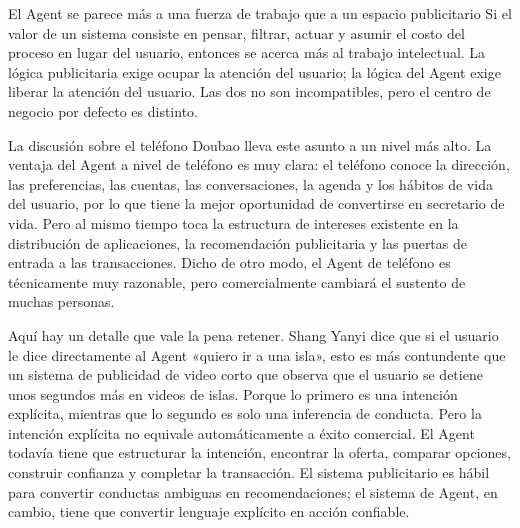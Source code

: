 \documentclass[a4paper]{article}
\begin{document}
\begin{importantbox}{El Agent se parece más a una fuerza de trabajo que a un espacio publicitario}
Si el valor de un sistema consiste en pensar, filtrar, actuar y asumir el costo del proceso en lugar del usuario, entonces se acerca más al trabajo intelectual. La lógica publicitaria exige ocupar la atención del usuario; la lógica del Agent exige liberar la atención del usuario. Las dos no son incompatibles, pero el centro de negocio por defecto es distinto.
\end{importantbox}

La discusión sobre el teléfono Doubao lleva este asunto a un nivel más alto. La ventaja del Agent a nivel de teléfono es muy clara: el teléfono conoce la dirección, las preferencias, las cuentas, las conversaciones, la agenda y los hábitos de vida del usuario, por lo que tiene la mejor oportunidad de convertirse en secretario de vida. Pero al mismo tiempo toca la estructura de intereses existente en la distribución de aplicaciones, la recomendación publicitaria y las puertas de entrada a las transacciones. Dicho de otro modo, el Agent de teléfono es técnicamente muy razonable, pero comercialmente cambiará el sustento de muchas personas.

Aquí hay un detalle que vale la pena retener. Shang Yanyi dice que si el usuario le dice directamente al Agent «quiero ir a una isla», esto es más contundente que un sistema de publicidad de video corto que observa que el usuario se detiene unos segundos más en videos de islas. Porque lo primero es una intención explícita, mientras que lo segundo es solo una inferencia de conducta. Pero la intención explícita no equivale automáticamente a éxito comercial. El Agent todavía tiene que estructurar la intención, encontrar la oferta, comparar opciones, construir confianza y completar la transacción. El sistema publicitario es hábil para convertir conductas ambiguas en recomendaciones; el sistema de Agent, en cambio, tiene que convertir lenguaje explícito en acción confiable.
\end{document}
